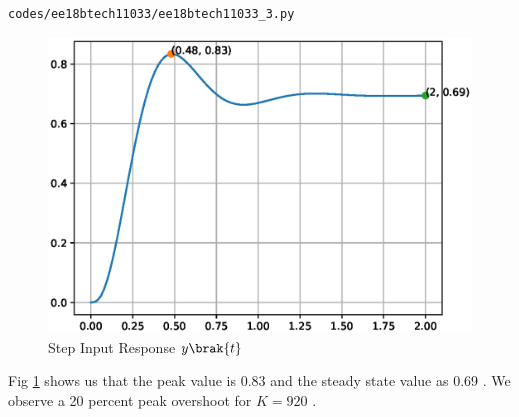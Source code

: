 \begin{enumerate}[label=\thesubsection.\arabic*.,ref=\thesubsection.\theenumi]
\begin{lstlisting}
codes/ee18btech11033/ee18btech11033_3.py
\end{lstlisting}

\begin{figure}[!ht]
\centering
\includegraphics[width=\columnwidth]{./figs/ee18btech11033/ee18btech11033_3.eps}
\caption{Step Input Response $y\brak{t}$}
\label{fig:ee18btech11033_3}
\end{figure}
Fig \ref{fig:ee18btech11033_3} shows us that the peak value is 0.83 and the steady state value as 0.69 . We observe a 20 percent peak overshoot for $K=920$ .  

 
\end{enumerate}









